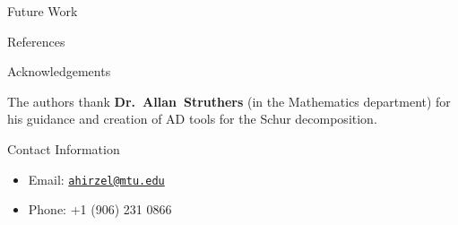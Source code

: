 \documentclass[final]{beamer}
\newlength{\onecolwid}
\begin{document}
\begin{frame}[t]
\begin{columns}[t]
\begin{column}{\onecolwid}
\begin{block}{Future Work}
\end{block}


\begin{block}{References}

\small{
\vspace{0.75in}}

\end{block}



\begin{block}{Acknowledgements}

The authors thank \textbf{Dr.~Allan~Struthers} (in the Mathematics department)
for his guidance and creation of AD tools for the Schur decomposition.

\end{block}



\begin{block}{Contact Information}

\begin{itemize}
\item Email: \href{mailto:ahirzel@mtu.edu}{\texttt{ahirzel@mtu.edu}}
\item Phone: +1 (906) 231 0866
\end{itemize}

\end{block}


\end{column}
\end{columns}
\end{frame}
\end{document}
